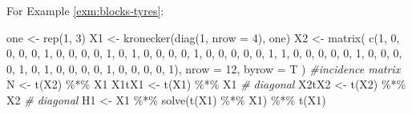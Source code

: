 \documentclass[
]{book}
\newenvironment{Shaded}{\begin{snugshade}}{\end{snugshade}}
\newcommand{\AttributeTok}[1]{\textcolor[rgb]{0.77,0.63,0.00}{#1}}
\newcommand{\CommentTok}[1]{\textcolor[rgb]{0.56,0.35,0.01}{\textit{#1}}}
\newcommand{\DecValTok}[1]{\textcolor[rgb]{0.00,0.00,0.81}{#1}}
\newcommand{\FunctionTok}[1]{\textcolor[rgb]{0.00,0.00,0.00}{#1}}
\newcommand{\NormalTok}[1]{#1}
\newcommand{\OtherTok}[1]{\textcolor[rgb]{0.56,0.35,0.01}{#1}}
\newcommand{\SpecialCharTok}[1]{\textcolor[rgb]{0.00,0.00,0.00}{#1}}
\theoremstyle{definition}
\theoremstyle{definition}
\theoremstyle{definition}
\theoremstyle{definition}
\theoremstyle{remark}
\begin{document}
For Example \ref{exm:blocks-tyres}:

\begin{Shaded}
\begin{Highlighting}[]
\NormalTok{one }\OtherTok{\textless{}{-}} \FunctionTok{rep}\NormalTok{(}\DecValTok{1}\NormalTok{, }\DecValTok{3}\NormalTok{)}
\NormalTok{X1 }\OtherTok{\textless{}{-}} \FunctionTok{kronecker}\NormalTok{(}\FunctionTok{diag}\NormalTok{(}\DecValTok{1}\NormalTok{, }\AttributeTok{nrow =} \DecValTok{4}\NormalTok{), one)}
\NormalTok{X2 }\OtherTok{\textless{}{-}} \FunctionTok{matrix}\NormalTok{(}
        \FunctionTok{c}\NormalTok{(}\DecValTok{1}\NormalTok{, }\DecValTok{0}\NormalTok{, }\DecValTok{0}\NormalTok{, }\DecValTok{0}\NormalTok{,}
          \DecValTok{0}\NormalTok{, }\DecValTok{1}\NormalTok{, }\DecValTok{0}\NormalTok{, }\DecValTok{0}\NormalTok{,}
          \DecValTok{0}\NormalTok{, }\DecValTok{0}\NormalTok{, }\DecValTok{1}\NormalTok{, }\DecValTok{0}\NormalTok{,}
          \DecValTok{1}\NormalTok{, }\DecValTok{0}\NormalTok{, }\DecValTok{0}\NormalTok{, }\DecValTok{0}\NormalTok{,}
          \DecValTok{0}\NormalTok{, }\DecValTok{1}\NormalTok{, }\DecValTok{0}\NormalTok{, }\DecValTok{0}\NormalTok{,}
          \DecValTok{0}\NormalTok{, }\DecValTok{0}\NormalTok{, }\DecValTok{0}\NormalTok{, }\DecValTok{1}\NormalTok{,}
          \DecValTok{1}\NormalTok{, }\DecValTok{0}\NormalTok{, }\DecValTok{0}\NormalTok{, }\DecValTok{0}\NormalTok{,}
          \DecValTok{0}\NormalTok{, }\DecValTok{0}\NormalTok{, }\DecValTok{1}\NormalTok{, }\DecValTok{0}\NormalTok{,}
          \DecValTok{0}\NormalTok{, }\DecValTok{0}\NormalTok{, }\DecValTok{0}\NormalTok{, }\DecValTok{1}\NormalTok{,}
          \DecValTok{0}\NormalTok{, }\DecValTok{1}\NormalTok{, }\DecValTok{0}\NormalTok{, }\DecValTok{0}\NormalTok{,}
          \DecValTok{0}\NormalTok{, }\DecValTok{0}\NormalTok{, }\DecValTok{1}\NormalTok{, }\DecValTok{0}\NormalTok{,}
          \DecValTok{0}\NormalTok{, }\DecValTok{0}\NormalTok{, }\DecValTok{0}\NormalTok{, }\DecValTok{1}\NormalTok{), }\AttributeTok{nrow =} \DecValTok{12}\NormalTok{, }\AttributeTok{byrow =}\NormalTok{ T}
\NormalTok{)}
\CommentTok{\#incidence matrix}
\NormalTok{N }\OtherTok{\textless{}{-}} \FunctionTok{t}\NormalTok{(X2) }\SpecialCharTok{\%*\%}\NormalTok{ X1}
\NormalTok{X1tX1 }\OtherTok{\textless{}{-}} \FunctionTok{t}\NormalTok{(X1) }\SpecialCharTok{\%*\%}\NormalTok{ X1 }\CommentTok{\# diagonal}
\NormalTok{X2tX2 }\OtherTok{\textless{}{-}} \FunctionTok{t}\NormalTok{(X2) }\SpecialCharTok{\%*\%}\NormalTok{ X2 }\CommentTok{\# diagonal}
\NormalTok{H1 }\OtherTok{\textless{}{-}}\NormalTok{ X1 }\SpecialCharTok{\%*\%} \FunctionTok{solve}\NormalTok{(}\FunctionTok{t}\NormalTok{(X1) }\SpecialCharTok{\%*\%}\NormalTok{ X1) }\SpecialCharTok{\%*\%} \FunctionTok{t}\NormalTok{(X1)}

\end{Highlighting}
\end{Shaded}
\end{document}
